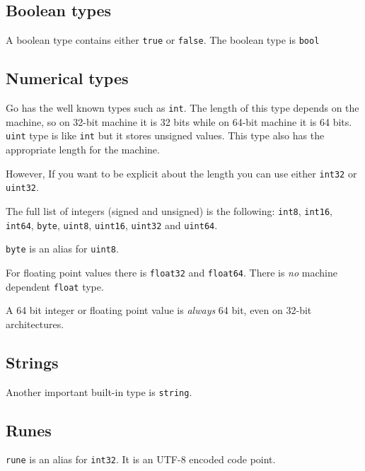 \documentclass[]{book}
\let\BeginKnitrBlock\begin \let\EndKnitrBlock\end
\begin{document}
\hypertarget{boolean-types}{%
\subsection{Boolean types}\label{boolean-types}}

A boolean type contains either \texttt{true} or \texttt{false}. The boolean type is \texttt{bool}

\hypertarget{numerical-types}{%
\subsection{Numerical types}\label{numerical-types}}

Go has the well known types such as \texttt{int}. The length of this type depends on
the machine, so on 32-bit machine it is 32 bits while on 64-bit machine it is
64 bits. \texttt{uint} type is like \texttt{int} but it stores unsigned values. This type
also has the appropriate length for the machine.

However, If you want to be explicit about the length you can use either \texttt{int32}
or \texttt{uint32}.

The full list of integers (signed and unsigned) is the following: \texttt{int8},
\texttt{int16}, \texttt{int64}, \texttt{byte}, \texttt{uint8}, \texttt{uint16}, \texttt{uint32} and \texttt{uint64}.

\BeginKnitrBlock{rmdnote}
\texttt{byte} is an alias for \texttt{uint8}.
\EndKnitrBlock{rmdnote}

For floating point values there is \texttt{float32} and \texttt{float64}. There is \emph{no}
machine dependent \texttt{float} type.

\BeginKnitrBlock{rmdnote}
A 64 bit integer or floating point value is \emph{always} 64 bit, even on 32-bit
architectures.
\EndKnitrBlock{rmdnote}

\hypertarget{strings}{%
\subsection{Strings}\label{strings}}

Another important built-in type is \texttt{string}.

\hypertarget{runes}{%
\subsection{Runes}\label{runes}}

\texttt{rune} is an alias for \texttt{int32}. It is an UTF-8 encoded code point.
\end{document}
